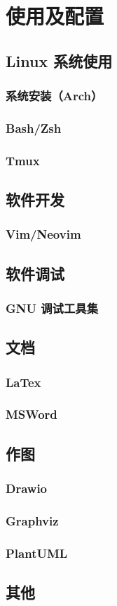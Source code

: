 \chapter{使用及配置}

\section{Linux 系统使用}
\subsection{系统安装（Arch）}
\subsection{Bash/Zsh}
\subsection{Tmux}

\section{软件开发}
\subsection{Vim/Neovim}

\section{软件调试}
\subsection{GNU 调试工具集}

\section{文档}
\subsection{LaTex}
\subsection{MSWord}

\section{作图}
\subsection{Drawio}
\subsection{Graphviz}
\subsection{PlantUML}

\section{其他}
